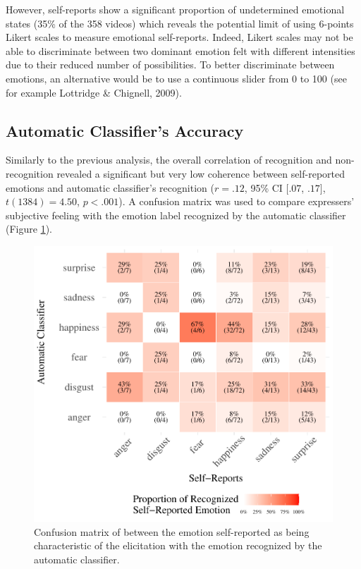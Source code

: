 \documentclass[
  english,
  man]{apa7}
\begin{document}
However, self-reports show a significant proportion of undetermined emotional states (35\% of the 358 videos) which reveals the potential limit of using 6-points Likert scales to measure emotional self-reports. Indeed, Likert scales may not be able to discriminate between two dominant emotion felt with different intensities due to their reduced number of possibilities. To better discriminate between emotions, an alternative would be to use a continuous slider from 0 to 100 (see for example Lottridge \& Chignell, 2009).

\hypertarget{automatic-classifiers-accuracy}{%
\subsection{Automatic Classifier's Accuracy}\label{automatic-classifiers-accuracy}}

Similarly to the previous analysis, the overall correlation of recognition and non-recognition revealed a significant but very low coherence between self-reported emotions and automatic classifier's recognition (\(r = .12\), 95\% CI \([.07\), \(.17]\), \(t(1384) = 4.50\), \(p < .001\)). A confusion matrix was used to compare expressers' subjective feeling with the emotion label recognized by the automatic classifier (Figure \ref{fig:confusionMatrix-sr-ar}).

\begin{figure}[!h]
\includegraphics[width=\textwidth]{manuscript_apa_files/figure-latex/confusionMatrix-sr-ar-1} \caption{Confusion matrix of between the emotion self-reported as being characteristic of the elicitation with the emotion recognized by the automatic classifier.}\label{fig:confusionMatrix-sr-ar}
\end{figure}
\end{document}

